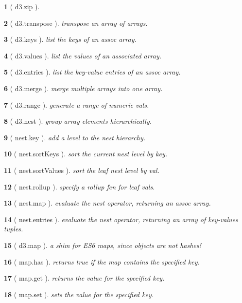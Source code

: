 \documentclass[10pt,landscape,letterpaper]{article}
\newcounter{thm}
\theoremstyle{mytheoremstyle}
\newtheorem*{thm}{}
\begin{document}
\begin{multicols}{3}
\begin{thm} [ d3.zip ]
\end{thm}\begin{thm} [ d3.transpose ]  transpose an array of arrays.
\end{thm}\begin{thm} [ d3.keys ]  list the keys of an assoc array.
\end{thm}\begin{thm} [ d3.values ]  list the values of an associated array.
\end{thm}\begin{thm} [ d3.entries ]  list the key-value entries of an assoc array.
\end{thm}\begin{thm} [ d3.merge ]  merge multiple arrays into one array.
\end{thm}\begin{thm} [ d3.range ]  generate a range of numeric vals.
\end{thm}\begin{thm} [ d3.nest ]  group array elements hierarchically.
\end{thm}\begin{thm} [ nest.key ]  add a level to the nest hierarchy.
\end{thm}\begin{thm} [ nest.sortKeys ]  sort the current nest level by key.
\end{thm}\begin{thm} [ nest.sortValues ]  sort the leaf nest level by val.
\end{thm}\begin{thm} [ nest.rollup ]  specify a rollup fcn for leaf vals.
\end{thm}\begin{thm} [ nest.map ]  evaluate the nest operator, returning an assoc array.
\end{thm}\begin{thm} [ nest.entries ]  evaluate the nest operator, returning an array of key-values tuples.
\end{thm}\begin{thm} [ d3.map ]  a shim for ES6 maps, since objects are not hashes!
\end{thm}\begin{thm} [ map.has ]  returns true if the map contains the specified key.
\end{thm}\begin{thm} [ map.get ]  returns the value for the specified key.
\end{thm}\begin{thm} [ map.set ]  sets the value for the specified key.

\end{thm}
\end{multicols}
\end{document}
